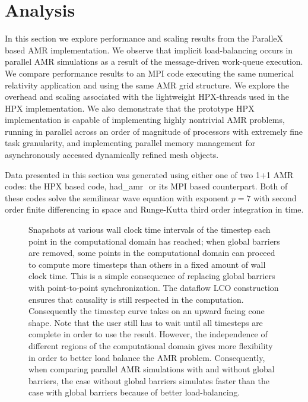 \documentclass{revtex4}
\newcommand{\had}{{\sc had\_amr}}
\begin{document}
\section{Analysis}
\label{sec:analysis}

In this section we explore performance and scaling results from the ParalleX based AMR implementation.  
We observe that implicit load-balancing occurs in parallel AMR simulations as a result of the
message-driven work-queue execution.  We compare performance results to an
MPI code executing the same numerical relativity application and using the same AMR grid structure.
We explore the overhead and scaling associated with the lightweight HPX-threads used in the 
HPX implementation.  
We also demonstrate that the prototype HPX implementation
is capable of
implementing highly nontrivial AMR problems,
running in parallel across an order of magnitude of processors with 
extremely fine task granularity, 
and implementing parallel memory management for asynchronously accessed dynamically refined mesh objects. 

Data presented in this section was generated using either one of two
1$+$1 AMR codes: the HPX based code, \had\,\, or its MPI based counterpart.
Both of these codes solve the semilinear wave equation with 
exponent $p=7$ with second order finite differencing in space and 
Runge-Kutta third order integration in time.  

\begin{figure}
 \caption{\small{Snapshots at various wall clock time intervals of the timestep each point in the computational domain has reached; when global barriers are removed, some points in the computational domain can proceed to compute more timesteps than others in a fixed amount of wall clock time.  This is a simple consequence of replacing global barriers with point-to-point synchronization.  
The dataflow LCO construction ensures that causality is still respected in the computation.  Consequently the timestep curve takes on an upward facing cone shape.    
Note that the user still has to wait until all timesteps are complete in order to use the result.  However, the independence of different regions of the computational domain gives more flexibility in order to better load balance the AMR problem. Consequently, when comparing parallel AMR simulations with and without global barriers, the case without global barriers simulates faster than the case with global barriers because of better load-balancing.
}} \label{fig:noglobalbarrier}
\end{figure}
\end{document}
